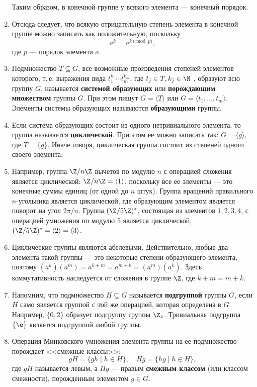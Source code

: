 \begin{enumerate}
Таким образом, в конечной группе у всякого элемента --- конечный порядок.

\item Отсюда следует, что всякую отрицательную степень элемента в конечной группе можно записать как положительную, поскольку
$$
a^k = a^{k\pmod p},
$$
где $p$ --- порядок элемента $a$.

\item Подмножество $T\subseteq G$, все возможные произведения степеней элементов которого, т.\,е. выражения вида $t_1^{k_1}\cdots t_m^{k_m}$, где $t_j\in T, k_j\in\N$ , образуют всю группу $G$, называется \textbf{системой образующих} или \textbf{порождающим множеством} группы $G$. При этом пишут $G=\langle T\rangle$ или $G=\langle t_1,\dots,t_m\rangle$. Элементы системы образующих называются \textbf{образующими} группы.
\item Если система образующих состоит из одного нетривиального элемента, то группа называется \textbf{циклической}. При этом ее можно записать так: $G=\langle g\rangle$, где $T=\{g\}$. Иначе говоря, циклическая группа состоит из степеней одного своего элемента.
\item Например, группа $\Z/n\Z$ вычетов по модулю $n$ с операцией сложения является циклической: $\Z/n\Z=\langle 1\rangle$, поскольку все ее элементы --- это конечные суммы единиц (от одной до $n$ штук). Группа вращений правильного $n$-угольника является циклической, где образующим элементом является поворот на угол $2\pi/n$. Группа $(\Z/5\Z)^*$, состоящая из элементов $1,2,3,4$, с операцией умножения по модулю 5 является циклической, $(\Z/5\Z)^*=\langle 2\rangle=\langle 3\rangle$.
\item Циклические группы являются абелевыми. Действительно, любые два элемента такой группы --- это некоторые степени образующего элемента, поэтому $(a^k)(a^m)=a^{k+m}=a^{m+k}=(a^m)(a^k)$. Здесь коммутативность наследуется от сложения в группе $\Z$, где $k+m=m+k$.


\item Напомним, что подмножество $H\subseteq G$ называется \textbf{подгруппой} группы $G$, если $H$ само является группой с той же операцией, которая определена в $G$. Например, $\{0,2\}$ образует подгруппу группы $\Z_4$. Тривиальная подгруппа $\{\e\}$ является подгруппой любой группы.

\item Операция Минковского умножения элемента группы на ее подмножество порождает <<смежные классы>>:
$$
gH=\{gh\mid h\in H\},\quad Hg=\{hg\mid h\in H\},
$$
где $gH$ называется левым, а $Hg$ --- правым \textbf{смежным классом} (или классом смежности), порожденным элементом $g\in G$.


\end{enumerate}
